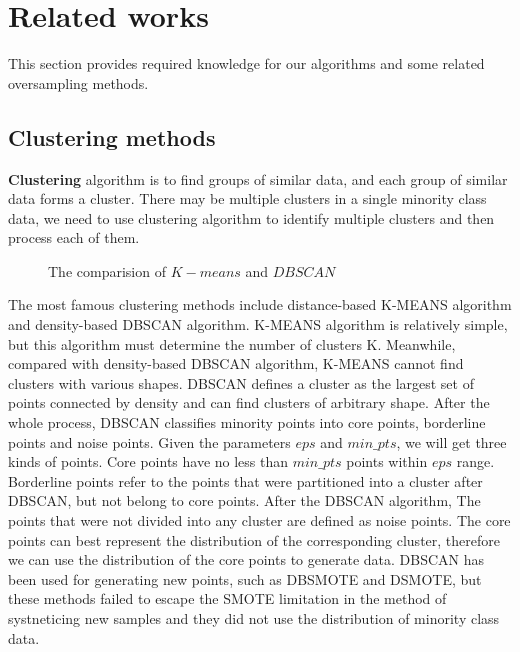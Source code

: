 \documentclass[runningheads]{llncs}
\begin{document}
\section{Related works}
This section provides required knowledge for our algorithms and some related oversampling methods.
\subsection{Clustering methods}
\textbf{Clustering} algorithm is to find groups of similar data, and each group of similar data forms a cluster.
There may be multiple clusters in a single minority class data, 
we need to use clustering algorithm to identify multiple clusters
 and then process each of them.
 \begin{figure}[tb]
  \centering
  \quad
  \caption{The comparision of $K-means$ and $DBSCAN$}
  \label{fig19}
  \end{figure}
The most famous clustering methods include distance-based K-MEANS algorithm and density-based DBSCAN algorithm.
K-MEANS algorithm is relatively simple, but this algorithm must determine the number of clusters K.
Meanwhile, compared with density-based DBSCAN algorithm, K-MEANS cannot find clusters with various shapes.
DBSCAN defines a cluster as the largest set of points
 connected by density and can find clusters of arbitrary shape. After the whole process,
  DBSCAN classifies minority points into core points,
  borderline points and noise points.
 Given the parameters $eps$ and $min\_pts$, we will get three kinds of points. 
 Core points have no less than
  $min\_pts$ points within $eps$ range. 
  Borderline points refer to the points that were partitioned into a cluster after DBSCAN,
  but not belong to core points. After the DBSCAN algorithm, The points that were not divided into any cluster are 
  defined as noise points.
The core points can best represent the distribution of the corresponding cluster, 
therefore we can use the distribution of the core points to generate data.
DBSCAN has been used for generating new points, such as DBSMOTE\cite{2012DBSMOTE} and
DSMOTE\cite{2019Over}, but these methods failed to escape the SMOTE limitation in 
the method of systneticing new samples and they did not use the distribution of minority class data.
\end{document}
